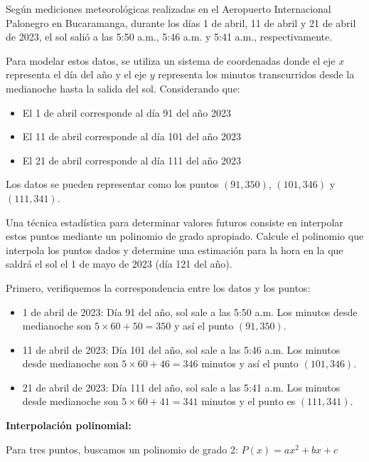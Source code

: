\begin{prob}
Según mediciones meteorológicas realizadas en el Aeropuerto Internacional Palonegro en Bucaramanga, durante los días 1 de abril, 11 de abril y 21 de abril de 2023, el sol salió a las 5:50 a.m., 5:46 a.m. y 5:41 a.m., respectivamente. 

Para modelar estos datos, se utiliza un sistema de coordenadas donde el eje $x$ representa el día del año y el eje $y$ representa los minutos transcurridos desde la medianoche hasta la salida del sol. Considerando que:
\begin{itemize}
\item El 1 de abril corresponde al día 91 del año 2023
\item El 11 de abril corresponde al día 101 del año 2023  
\item El 21 de abril corresponde al día 111 del año 2023
\end{itemize}

Los datos se pueden representar como los puntos $(91,350)$, $(101,346)$ y $(111,341)$.

Una técnica estadística para determinar valores futuros consiste en interpolar estos puntos mediante un polinomio de grado apropiado. Calcule el polinomio que interpola los puntos dados y determine una estimación para la hora en la que saldrá el sol el 1 de mayo de 2023 (día 121 del año).

\begin{myproof} Primero, verifiquemos la correspondencia entre los datos y los puntos:
\begin{itemize}
\item 1 de abril de 2023: Día 91 del año, sol sale a las 5:50 a.m. Los minutos desde medianoche son $5 \times 60 + 50 = 350$ y así el punto $(91, 350).$

\item 11 de abril de 2023: Día 101 del año, sol sale a las 5:46 a.m. Los minutos desde medianoche son $5 \times 60 + 46 = 346$ minutos y así el punto $(101, 346).$

\item 21 de abril de 2023: Día 111 del año, sol sale a las 5:41 a.m. Los minutos desde medianoche son $5 \times 60 + 41 = 341$ minutos y el punto es $(111, 341).$ 
\end{itemize}


\textbf{Interpolación polinomial:}

Para tres puntos, buscamos un polinomio de grado 2: $P(x) = ax^2 + bx + c$


\end{myproof}
\end{prob}
